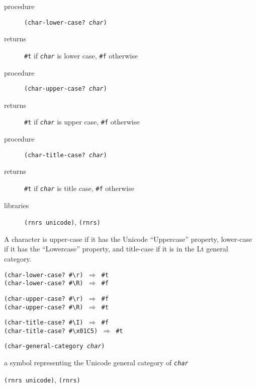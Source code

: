 \begin{description}

\label{objects_s204}\item[procedure] \texttt{(char-lower-case? \textit{char})}



\item[returns] \texttt{\#{}t} if \texttt{\textit{char}} is lower case, \texttt{\#{}f} otherwise


\item[procedure] \texttt{(char-upper-case? \textit{char})}



\item[returns] \texttt{\#{}t} if \texttt{\textit{char}} is upper case, \texttt{\#{}f} otherwise


\item[procedure] \texttt{(char-title-case? \textit{char})}



\item[returns] \texttt{\#{}t} if \texttt{\textit{char}} is title case, \texttt{\#{}f} otherwise


\item[libraries] \texttt{(rnrs unicode)}, \texttt{(rnrs)}
\end{description}


A character is upper-case if it has the Unicode ``Uppercase'' property,
lower-case if it has the ``Lowercase'' property, and title-case if it is
in the Lt general category.


\begin{alltt}
(char-lower-case? \#{}\textbackslash{}r) \(\Rightarrow\) \#{}t
(char-lower-case? \#{}\textbackslash{}R) \(\Rightarrow\) \#{}f

(char-upper-case? \#{}\textbackslash{}r) \(\Rightarrow\) \#{}f
(char-upper-case? \#{}\textbackslash{}R) \(\Rightarrow\) \#{}t

(char-title-case? \#{}\textbackslash{}I) \(\Rightarrow\) \#{}f
(char-title-case? \#{}\textbackslash{}x01C5) \(\Rightarrow\) \#{}t
\end{alltt}

\begin{description}

\label{objects_s205}\item[procedure] \texttt{(char-general-category \textit{char})}



\item[returns] a symbol representing the Unicode general category of \texttt{\textit{char}}


\item[libraries] \texttt{(rnrs unicode)}, \texttt{(rnrs)}
\end{description}


